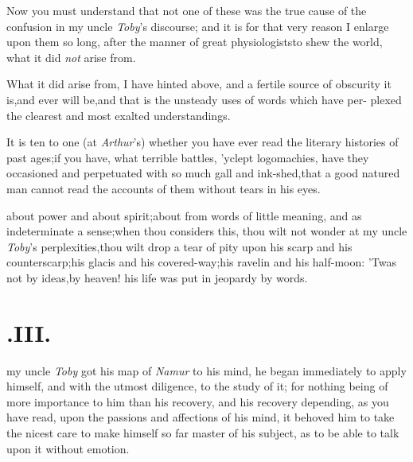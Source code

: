 \documentclass{article}
\begin{document}
Now you must understand that not one of these was the true cause
of the confusion in my uncle \textit{Toby}’s discourse; and it
is for that very reason I enlarge upon them so long, after the
manner of great physiologists\tsk to shew the world, what it did
\textit{not} arise from.

What it did arise from, I have hinted above, and a fertile
source of obscurity it is,\tsk and ever will be,\tsk and that
is the unsteady uses of words which have per- plexed the clearest
and most exalted understandings.

It is ten to one (at \textit{Arthur}’s) whether you have
ever read the literary histories of past ages;\tsk if you
have,\tsk
what terrible battles, ’yclept logomachies, have they
occasioned and perpetuated with so much gall and
ink-shed,\tsk that a good natured man cannot read the accounts of
them without tears in his eyes.

\noindent
{}
about power and about spirit;\tsk about
from words of little meaning, and as
indeterminate a sense;\tsk when thou consi\-ders this, thou wilt not
wonder at my uncle \textit{Toby}’s perplexities,\tsk thou
wilt drop a tear of pity upon his scarp and his
counterscarp;\tsk his glacis and his covered-way;\tsk his
ravelin and his half-moon:\break
’Twas not by ideas,\tsh by heaven!\break
his life was put in jeopardy by words.

\null
\section{.\enspace  III.}

 my uncle \textit{Toby} got his map
of \textit{Namur} to his mind, he began immediately to apply himself,
and with the utmost diligence, to the study of it; for
nothing being of more importance to him than his
recovery, and his
reco\-very depending, as you have read, upon the passions and
affections of his mind, it behoved him to take the nicest care to
make himself so far master of his subject, as to be able to talk
upon it without emotion.
\end{document}
